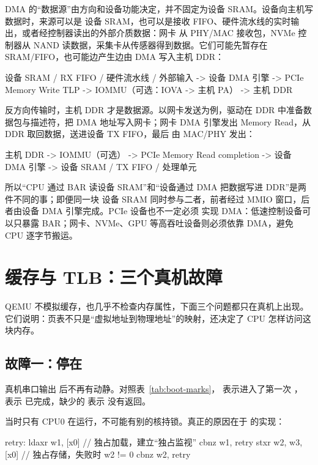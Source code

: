 DMA 的“数据源”由方向和设备功能决定，并不固定为设备 SRAM。设备向主机写数据时，来源可以是
设备 SRAM，也可以是接收 FIFO、硬件流水线的实时输出，或者经控制器读出的外部介质数据：网卡
从 PHY/MAC 接收包，NVMe 控制器从 NAND 读数据，采集卡从传感器得到数据。它们可能先暂存在
SRAM/FIFO，也可能边产生边由 DMA 写入主机 DDR：

\begin{txtcode}
设备 SRAM / RX FIFO / 硬件流水线 / 外部输入
        -> 设备 DMA 引擎
        -> PCIe Memory Write TLP
        -> IOMMU（可选：IOVA -> 主机 PA）
        -> 主机 DDR
\end{txtcode}

反方向传输时，主机 DDR 才是数据源。以网卡发送为例，驱动在 DDR 中准备数据包与描述符，把
DMA 地址写入网卡；网卡 DMA 引擎发出 Memory Read，从 DDR 取回数据，送进设备 TX FIFO，最后
由 MAC/PHY 发出：

\begin{txtcode}
主机 DDR
        -> IOMMU（可选）
        -> PCIe Memory Read completion
        -> 设备 DMA 引擎
        -> 设备 SRAM / TX FIFO / 处理单元
\end{txtcode}

所以“CPU 通过 BAR 读设备 SRAM”和“设备通过 DMA 把数据写进 DDR”是两件不同的事；即便同一块
设备 SRAM 同时参与二者，前者经过 MMIO 窗口，后者由设备 DMA 引擎完成。PCIe 设备也不一定必须
实现 DMA：低速控制设备可以只暴露 BAR；网卡、NVMe、GPU 等高吞吐设备则必须依靠 DMA，避免 CPU
逐字节搬运。

\section{缓存与 TLB：三个真机故障}
\label{sec:caches}

QEMU 不模拟缓存，也几乎不检查内存属性，下面三个问题都只在真机上出现。它们说明：页表不只是“虚拟地址到物理地址”的映射，还决定了 CPU 怎样访问这块内存。

\subsection{故障一：停在 }
\label{sec:fault1}

真机串口输出  后不再有动静。对照表~\ref{tab:boot-marks}， 表示进入了第一次 ， 表示  已完成，缺少的  表示  没有返回。

当时只有 CPU0 在运行，不可能有别的核持锁。真正的原因在于  的实现：

\begin{asmcode}
retry:  ldaxr w1, [x0]      // 独占加载，建立“独占监视”
        cbnz  w1, retry
        stxr  w2, w3, [x0]  // 独占存储，失败时 w2 != 0
        cbnz  w2, retry
\end{asmcode}

